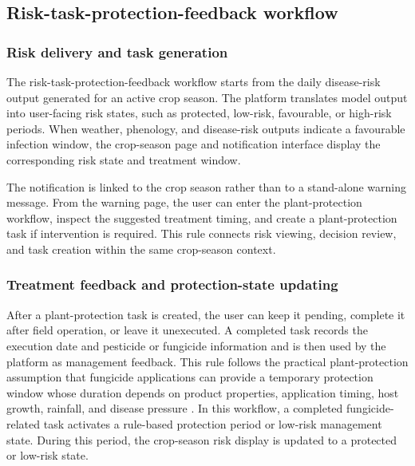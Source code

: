 \documentclass[12pt]{article}
\begin{document}
\subsection{Risk-task-protection-feedback workflow}\label{closed-loop-workflow-and-evaluation-boundaries}

\subsubsection{Risk delivery and task generation}\label{risk-delivery-and-task-generation}

The risk-task-protection-feedback workflow starts from the daily disease-risk output generated for an active crop season. The platform translates model output into user-facing risk states, such as protected, low-risk, favourable, or high-risk periods. When weather, phenology, and disease-risk outputs indicate a favourable infection window, the crop-season page and notification interface display the corresponding risk state and treatment window.

The notification is linked to the crop season rather than to a stand-alone warning message. From the warning page, the user can enter the plant-protection workflow, inspect the suggested treatment timing, and create a plant-protection task if intervention is required. This rule connects risk viewing, decision review, and task creation within the same crop-season context.

\subsubsection{Treatment feedback and protection-state updating}\label{treatment-feedback-and-protection-state-updating}

After a plant-protection task is created, the user can keep it pending, complete it after field operation, or leave it unexecuted. A completed task records the execution date and pesticide or fungicide information and is then used by the platform as management feedback. This rule follows the practical plant-protection assumption that fungicide applications can provide a temporary protection window whose duration depends on product properties, application timing, host growth, rainfall, and disease pressure \citep{caffiFungicideModelsAre2018,bleyerTogetherBetterImprovement2020,oliverFungicideUsePatterns2023,warnekeEffectFungicideMobility2020}. In this workflow, a completed fungicide-related task activates a rule-based protection period or low-risk management state. During this period, the crop-season risk display is updated to a protected or low-risk state.
\end{document}
